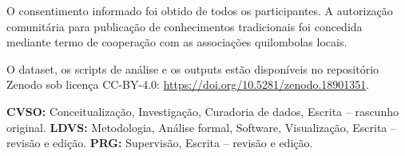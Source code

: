 \documentclass[pdflatex,sn-basic]{sn-jnl}%
\theoremstyle{thmstyleone}%
\theoremstyle{thmstyletwo}%
\theoremstyle{thmstylethree}%
\begin{document}
O consentimento informado foi obtido de todos os participantes. A autorização comunitária para publicação de conhecimentos tradicionais foi concedida mediante termo de cooperação com as associações quilombolas locais.


O dataset, os scripts de análise e os outputs estão disponíveis no repositório Zenodo sob licença CC-BY-4.0: \url{https://doi.org/10.5281/zenodo.18901351}.


\textbf{CVSO:} Conceitualização, Investigação, Curadoria de dados, Escrita -- rascunho original. \textbf{LDVS:} Metodologia, Análise formal, Software, Visualização, Escrita -- revisão e edição. \textbf{PRG:} Supervisão, Escrita -- revisão e edição.




\fi
\end{document}
